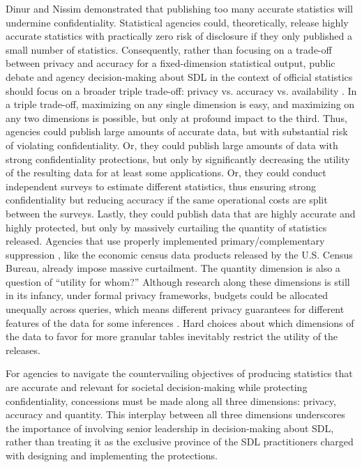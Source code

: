 Dinur and Nissim \cite{dinur:nissim:2003:10.1145/773153.773173} demonstrated that publishing too many accurate statistics will undermine confidentiality. Statistical agencies could, theoretically, release highly accurate statistics with practically zero risk of disclosure if they only published a small number of statistics. Consequently, rather than focusing on a trade-off between privacy and accuracy for a fixed-dimension statistical output, public debate and agency decision-making about SDL in the context of official statistics should focus on a broader triple trade-off:  privacy vs. accuracy vs. availability \cite{hawes2021}. In a triple trade-off, maximizing on any single dimension is easy, and maximizing on any two dimensions is possible, but only at profound impact to the third. Thus, agencies could publish large amounts of accurate data, but with substantial risk of violating confidentiality. Or, they could publish large amounts of data with strong confidentiality protections, but only by significantly decreasing the utility of the resulting data for at least some applications. Or, they could conduct independent surveys to estimate different statistics, thus ensuring strong confidentiality but reducing accuracy if the same operational costs are split between the surveys. Lastly, they could publish data that are highly accurate and highly protected, but only by massively curtailing the quantity of statistics released. Agencies that use properly implemented primary/complementary suppression \cite{cox:1995}, like the economic census data products released by the U.S. Census Bureau, already impose massive curtailment. 
The quantity dimension is also a question of ``utility for whom?'' Although research along these dimensions is still in its infancy, under formal privacy frameworks, budgets could be allocated unequally across queries, which means different privacy guarantees for different features of the data for some inferences \cite{kifer:et:al:2022}.
Hard choices about which dimensions of the data to favor for more granular tables inevitably restrict the utility of the releases.

For agencies to navigate the countervailing objectives of producing statistics that are accurate and relevant for societal decision-making while protecting confidentiality, concessions must be made along all three dimensions: privacy, accuracy and quantity. This interplay between all three dimensions underscores the importance of involving senior leadership in decision-making about SDL, rather than treating it as the exclusive province of the SDL practitioners charged with designing and implementing the protections.

